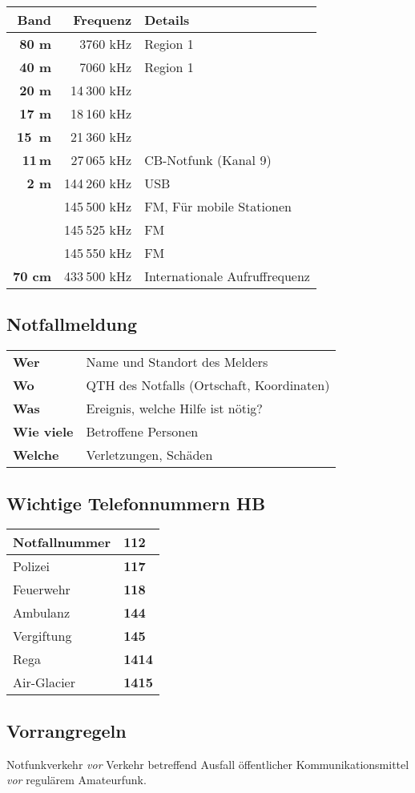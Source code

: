 \begin{tabular}{r r l}
\bfseries Band & \bfseries Frequenz & \bfseries Details \\
\toprule \arrayrulecolor{rowsep}
\bfseries 80 m  & 3760 kHz & Region 1 \\ \midrule
\bfseries 40 m  & 7060 kHz & Region 1 \\ \midrule
\bfseries 20 m  & 14 300 kHz &  \\ \midrule
\bfseries 17 m  & 18 160 kHz &  \\ \midrule
\bfseries 15 m  & 21 360 kHz &  \\ \midrule
\bfseries 11\,m & 27\,065 kHz & CB-Notfunk (Kanal 9) \\ \midrule
\bfseries 2 m   & 144 260 kHz & USB \\ \midrule
                & 145 500 kHz & FM, Für mobile Stationen \\ \midrule
                & 145 525 kHz & FM \\ \midrule
                & 145 550 kHz & FM \\ \midrule
\bfseries 70 cm & 433 500 kHz & Internationale Aufruffrequenz \\ \midrule
\end{tabular}


\subsection{Notfallmeldung}

\noindent
\begin{tabular}{>{\bfseries} l l}
Wer & Name und Standort des Melders \\ 
Wo & QTH des Notfalls (Ortschaft, Koordinaten) \\ 
Was & Ereignis, welche Hilfe ist nötig? \\ 
Wie viele & Betroffene Personen \\ 
Welche & Verletzungen, Schäden
\end{tabular}

\subsection{Wichtige Telefonnummern HB}
\begin{tabular}{l  >{\bfseries} l}
Notfallnummer & 112 \\ \midrule
Polizei & 117 \\ \midrule
Feuerwehr & 118 \\ \midrule
Ambulanz & 144 \\ \midrule
Vergiftung & 145 \\ \midrule
Rega & 1414 \\ \midrule
Air-Glacier & 1415 \\ \midrule
\end{tabular}

\subsection{Vorrangregeln}
Notfunkverkehr \textit{vor} Verkehr betreffend Ausfall öffentlicher Kommunikationsmittel \textit{vor} regulärem Amateurfunk.